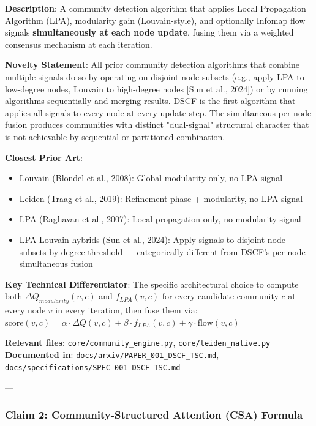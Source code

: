 \documentclass[10pt,journal,compsoc]{IEEEtran}
\begin{document}
\textbf{Description}: A community detection algorithm that applies Local Propagation Algorithm (LPA), modularity gain (Louvain-style), and optionally Infomap flow signals \textbf{simul\-taneously at each node update}, fusing them via a weighted consensus mechanism at each iteration.

\textbf{Novelty Statement}: All prior community detection algorithms that combine multiple signals do so by operating on disjoint node subsets (e.g., apply LPA to low-degree nodes, Louvain to high-degree nodes [Sun et al., 2024]) or by running algorithms seque\-ntially and merging results. DSCF is the first algorithm that applies all signals to every node at every update step. The simul\-taneous per-node fusion produces communities with distinct "dual-signal" structural character that is not achievable by sequential or partitioned combination.

\textbf{Closest Prior Art}:
\begin{itemize}
\item Louvain (Blondel et al., 2008): Global modularity only, no LPA signal
\item Leiden (Traag et al., 2019): Refinement phase + modularity, no LPA signal
\item LPA (Raghavan et al., 2007): Local propagation only, no modularity signal
\item LPA-Louvain hybrids (Sun et al., 2024): Apply signals to disjoint node subsets by degree threshold — categ\-orically different from DSCF's per-node simul\-taneous fusion

\end{itemize}
\textbf{Key Technical Differ\-entiator}: The specific archi\-tectural choice to compute both $\Delta Q_{modularity}(v, c)$ and $f_{LPA}(v, c)$ for every candidate community $c$ at every node $v$ in every iteration, then fuse them via: $\text{score}(v, c) = \alpha \cdot \Delta Q(v,c) + \beta \cdot f_{LPA}(v,c) + \gamma \cdot \text{flow}(v,c)$

\textbf{Relevant files}: \texttt{core/community\_engine.py}, \texttt{core/leiden\_native.py}
\textbf{Documented in}: \texttt{docs/arxiv/PAPER\_001\_DSCF\_TSC.md}, \texttt{docs/specifications/SPEC\_001\_DSCF\_TSC.md}

---

\subsubsection{Claim 2: Community-Structured Attention (CSA) Formula}
\end{document}
